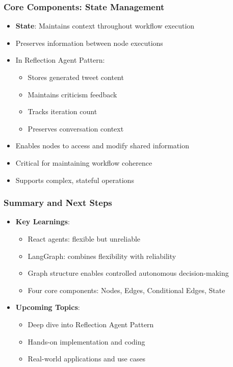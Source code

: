 \begin{frame}[fragile]\frametitle{Core Components: State Management}
      \begin{itemize}
        \item \textbf{State}: Maintains context throughout workflow execution
        \item Preserves information between node executions
        \item In Reflection Agent Pattern:
        \begin{itemize}
            \item Stores generated tweet content
            \item Maintains criticism feedback
            \item Tracks iteration count
            \item Preserves conversation context
        \end{itemize}
        \item Enables nodes to access and modify shared information
        \item Critical for maintaining workflow coherence
        \item Supports complex, stateful operations
      \end{itemize}
\end{frame}

\begin{frame}[fragile]\frametitle{Summary and Next Steps}
      \begin{itemize}
        \item \textbf{Key Learnings}:
        \begin{itemize}
            \item React agents: flexible but unreliable
            \item LangGraph: combines flexibility with reliability
            \item Graph structure enables controlled autonomous decision-making
            \item Four core components: Nodes, Edges, Conditional Edges, State
        \end{itemize}
        \item \textbf{Upcoming Topics}:
        \begin{itemize}
            \item Deep dive into Reflection Agent Pattern
            \item Hands-on implementation and coding
            \item Real-world applications and use cases
        \end{itemize}
      \end{itemize}
\end{frame}

